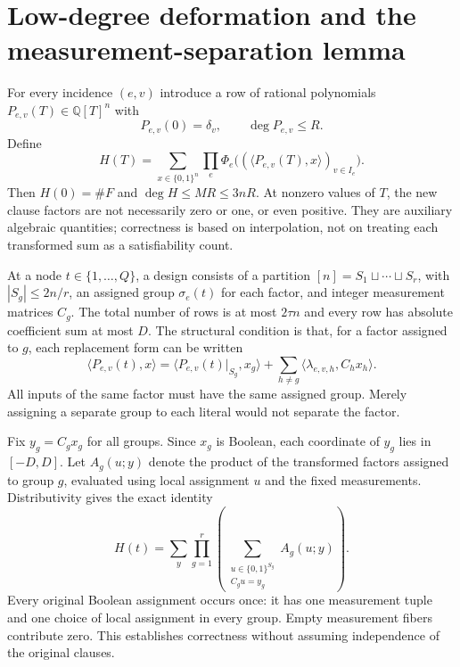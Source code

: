 \documentclass[11pt,a4paper]{article}
\numberwithin{equation}{section}
\theoremstyle{definition}
\theoremstyle{remark}
\newcommand{\C}{\mathbb C}
\newcommand{\Q}{\mathbb Q}
\begin{document}
\section{Low-degree deformation and the measurement-separation lemma}
\label{sec:design}
For every incidence $(e,v)$ introduce a row of rational polynomials
$P_{e,v}(T)\in\Q[T]^n$ with
\[
 P_{e,v}(0)=\delta_v,\qquad \deg P_{e,v}\le R.
\]
Define
\begin{equation}\label{eq:H}
 H(T)=\sum_{x\in\{0,1\}^n}
       \prod_e\Phi_e\bigl((\langle P_{e,v}(T),x\rangle)_{v\in I_e}\bigr).
\end{equation}
Then $H(0)=\#F$ and $\deg H\le MR\le3nR$. At nonzero values of $T$, the
new clause factors are not necessarily zero or one, or even positive. They
are auxiliary algebraic quantities; correctness is based on interpolation,
not on treating each transformed sum as a satisfiability count.

At a node $t\in\{1,\ldots,Q\}$, a design consists of a partition
$[n]=S_1\sqcup\cdots\sqcup S_r$, with $|S_g|\le2n/r$, an assigned group
$\sigma_e(t)$ for each factor, and integer measurement matrices $C_g$.
The total number of rows is at most $2\tau n$ and every row has absolute
coefficient sum at most $D$. The structural condition is that, for a factor
assigned to $g$, each replacement form can be written
\begin{equation}\label{eq:rowspace}
 \langle P_{e,v}(t),x\rangle
 =\langle P_{e,v}(t)|_{S_g},x_g\rangle+
       \sum_{h\ne g}\langle\lambda_{e,v,h},C_hx_h\rangle.
\end{equation}
All inputs of the same factor must have the same assigned group. Merely
assigning a separate group to each literal would not separate the factor.

Fix $y_g=C_gx_g$ for all groups. Since $x_g$ is Boolean, each coordinate of
$y_g$ lies in $[-D,D]$. Let $A_g(u;y)$ denote the product of the transformed
factors assigned to group $g$, evaluated using local assignment $u$ and the
fixed measurements. Distributivity gives the exact identity
\begin{equation}\label{eq:separate}
 H(t)=\sum_y\prod_{g=1}^r
   \left(\sum_{\substack{u\in\{0,1\}^{S_g}\\C_gu=y_g}}A_g(u;y)\right).
\end{equation}
Every original Boolean assignment occurs once: it has one measurement tuple
and one choice of local assignment in every group. Empty measurement fibers
contribute zero. This establishes correctness without assuming independence
of the original clauses.
\end{document}
